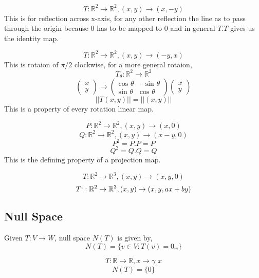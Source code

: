 \documentclass[11pt,a4paper]{colorart}
\def\l{\left}
\def\r{\right}
\def\R{\mathbb{R}}
\def\g{\gamma}
\begin{document}
\begin{example}[Reflection]
	\[ T:\R^2 \rightarrow \R^2,\l(x,y\r)\rightarrow\l(x,-y\r) \]
	This is for reflection across x-axis, for any other reflection the line as to pass through the origin because $0$ has to be mapped to 0 and in general $T.T$ gives us the identity map.
\end{example}

\begin{example}[Rotation]
	\[ T:\R^2\rightarrow\R^2,\l(x,y\r)\rightarrow \l(-y,x\r) \]
	This is rotaion of $\pi /2$ clockwise, for a more general rotaion,
	\[ T_\theta : \R^2 \rightarrow \R^2 \]
	\[ \begin{pmatrix} x\\y\end{pmatrix} \rightarrow
	   \begin{pmatrix} \text{cos }\theta &-\text{sin }\theta\\
	   \text{sin }\theta & \text{cos }\theta \end{pmatrix} 
	   \begin{pmatrix} x\\y\end{pmatrix}\]
	\[ ||T\l(x,y\r)|| =||\l(x,y\r)|| \]
	This is a property of every rotation linear map.
\end{example}

\begin{example}[Projection]
	\[ P:\R^2\rightarrow\R^2,\l(x,y\r)\rightarrow\l(x,0\r)\]
	\[ Q:\R^2\rightarrow\R^2,\l(x,y\r)\rightarrow\l(x-y,0\r)\]
	\[ P^2 = P.P = P \]
	\[ Q^2 = Q.Q = Q \]
	This is the defining property of a projection map.
\end{example}

\begin{example}[Inclusion]
	\[ T:\R^2\rightarrow\R^3,\l(x,y\r)\rightarrow\l(x,y,0\r)\]
	\[ T`:\R^2\rightarrow\R^3,\l(x,y\r)\rightarrow\l(x,y,ax+by\r)\]
\end{example}

\subsection{Null Space}

\begin{definition}
	Given $T:V\rightarrow W $, null space $N\l(T\r)$ is given by,
	\[ N\l(T\r) = \{ v \in V: T\l(v\r) = 0_w \} \]
\end{definition}

\begin{example}
	\[ T:\R\rightarrow\R,x\rightarrow\g_\circ x\]
	\[ N\l(T\r) = \{ 0\} \]
\end{example}
\end{document}
